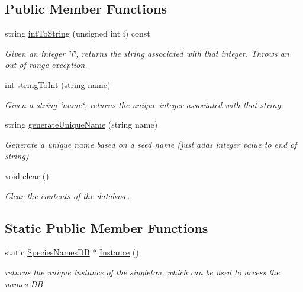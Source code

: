 \subsection*{Public Member Functions}
\begin{DoxyCompactItemize}
\item 
string \hyperlink{classSpeciesNamesDB_ac2cc60cba624407d270e0de80c6f20fe}{int\+To\+String} (unsigned int i) const 
\begin{DoxyCompactList}\small\item\em Given an integer \char`\"{}i\char`\"{}, returns the string associated with that integer. Throws an out of range exception. \end{DoxyCompactList}\item 
int \hyperlink{classSpeciesNamesDB_acc0a62d3f071e1c3fd85ae3d7565c381}{string\+To\+Int} (string name)
\begin{DoxyCompactList}\small\item\em Given a string \char`\"{}name\char`\"{}, returns the unique integer associated with that string. \end{DoxyCompactList}\item 
string \hyperlink{classSpeciesNamesDB_a711325156ec7d770ac59ae2bb35cc17d}{generate\+Unique\+Name} (string name)
\begin{DoxyCompactList}\small\item\em Generate a unique name based on a seed name (just adds integer value to end of string) \end{DoxyCompactList}\item 
void \hyperlink{classSpeciesNamesDB_a7387ec4eb51c377cd56bf3eaeabad4f0}{clear} ()
\begin{DoxyCompactList}\small\item\em Clear the contents of the database. \end{DoxyCompactList}\end{DoxyCompactItemize}
\subsection*{Static Public Member Functions}
\begin{DoxyCompactItemize}
\item 
static \hyperlink{classSpeciesNamesDB}{Species\+Names\+D\+B} $\ast$ \hyperlink{classSpeciesNamesDB_a845e8c31528ebce2177f916ef6018614}{Instance} ()
\begin{DoxyCompactList}\small\item\em returns the unique instance of the singleton, which can be used to access the names D\+B \end{DoxyCompactList}\end{DoxyCompactItemize}
